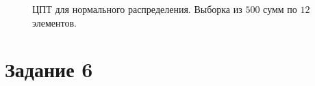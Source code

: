\documentclass[12pt, a4paper]{article}
\begin{document}
\begin{figure}[H]
\caption{ЦПТ для нормального распределения. Выборка из $500$ сумм по $12$ элементов.}
\end{figure}

\newpage 

\section{Задание 6}
\end{document}
